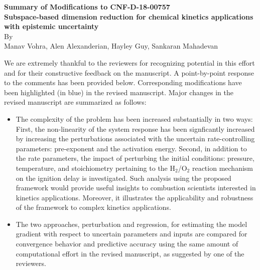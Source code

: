 \documentclass[11pt,final]{article}
\begin{document}
\begin{center}
{\bf Summary of Modifications to CNF-D-18-00757}\\[6pt]
{\bf Subspace-based dimension reduction for chemical kinetics applications with 
epistemic uncertainty}\\[6pt]
By \\
Manav Vohra, Alen Alexanderian, Hayley Guy, Sankaran Mahadevan 
\end{center}

\baselineskip=22pt


\vspace*{1in}


We are extremely thankful to the reviewers for recognizing potential in this effort and 
for their constructive feedback on the manuscript. A point-by-point
response to the comments has been provided below. Corresponding modifications have been
highlighted (in blue) in the revised manuscript. Major changes in the revised manuscript
are summarized as follows:

\begin{itemize}

\item The complexity of the problem has been increased substantially in two ways: First, 
the non-linearity of the system response has been signficantly increased by increasing
the perturbations associated with the uncertain rate-controlling parameters: pre-exponent
and the activation energy. Second, in addition to the rate parameters, the impact of
perturbing the initial conditions: pressure, temperature, and stoichiometry pertaining to the
H$_2$/O$_2$ reaction mechanism on the ignition delay is investigated. Such analysis using the
proposed framework would provide useful insights to combustion scientists interested in
kinetics applications. Moreover, it illustrates the applicability and robustness of the 
framework to complex kinetics applications. 

\item The two approaches, perturbation and regression, for estimating the model gradient
with respect to uncertain parameters and inputs are compared for convergence behavior and
predictive accuracy using the same amount of
computational effort in the revised manuscript, as suggested by one of the reviewers. 

\end{itemize} 
\end{document}
